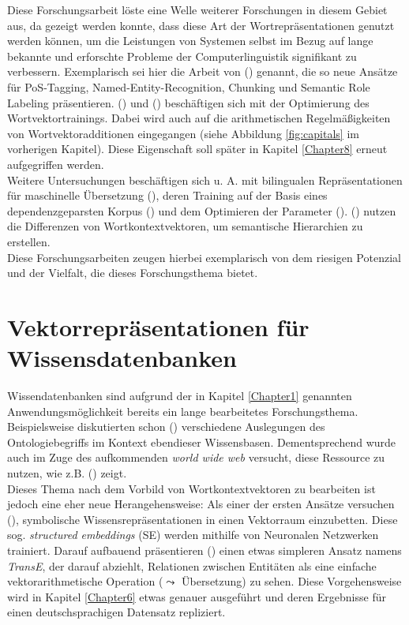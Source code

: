 Diese Forschungsarbeit löste eine Welle weiterer Forschungen in diesem Gebiet aus, da gezeigt werden konnte, dass diese
Art der Wortrepräsentationen genutzt werden können, um die Leistungen von Systemen selbst im Bezug auf lange bekannte und
erforschte Probleme der Computerlinguistik signifikant zu verbessern. Exemplarisch sei hier die Arbeit von
(\cite{collobert2011natural}) genannt, die so neue Ansätze für PoS-Tagging, Named-Entity-Recognition, Chunking und Semantic
Role Labeling präsentieren. (\cite{mikolov2013efficient}) und (\cite{mikolov2013distributed}) beschäftigen sich mit der
Optimierung des Wortvektortrainings. Dabei wird auch auf die arithmetischen Regelmäßigkeiten von Wortvektoradditionen
eingegangen (siehe Abbildung \ref{fig:capitals} im vorherigen Kapitel). Diese Eigenschaft soll später in Kapitel \ref{Chapter8} erneut
aufgegriffen werden.\\

Weitere Untersuchungen beschäftigen sich u. A. mit bilingualen Repräsentationen für maschinelle Übersetzung (\cite{zou2013bilingual}),
deren Training auf der Basis eines dependenzgeparsten Korpus (\cite{levy2014dependency}) und dem Optimieren der Parameter
(\cite{levy2015improving}). (\cite{fu2014learning}) nutzen die Differenzen von Wortkontextvektoren, um semantische
Hierarchien zu erstellen.\\
Diese Forschungsarbeiten zeugen hierbei exemplarisch von dem riesigen Potenzial und der Vielfalt, die dieses
Forschungsthema bietet.

\section{Vektorrepräsentationen für Wissensdatenbanken}

Wissendatenbanken sind aufgrund der in Kapitel \ref{Chapter1} genannten Anwendungsmöglichkeit bereits ein lange bearbeitetes
Forschungsthema. Beispielsweise diskutierten schon (\cite{giaretta1995ontologies}) verschiedene Auslegungen des Ontologiebegriffs
im Kontext ebendieser Wissensbasen. Dementsprechend wurde auch im Zuge des aufkommenden \emph{world wide web} versucht, diese
Ressource zu nutzen, wie z.B. (\cite{craven2000learning}) zeigt.\\
Dieses Thema nach dem Vorbild von Wortkontextvektoren zu bearbeiten ist jedoch eine eher neue Herangehensweise: Als
einer der ersten Ansätze versuchen (\cite{bordes2011learning}), symbolische Wissensrepräsentationen in einen Vektorraum
einzubetten. Diese sog. \emph{structured embeddings} (SE) werden mithilfe von Neuronalen Netzwerken trainiert.
Darauf aufbauend präsentieren (\cite{bordes2013translating}) einen etwas simpleren Ansatz namens \emph{TransE}, der darauf abziehlt, Relationen
zwischen Entitäten als eine einfache vektorarithmetische Operation ($\leadsto$ Übersetzung) zu sehen. Diese Vorgehensweise wird in Kapitel \ref{Chapter6}
etwas genauer ausgeführt und deren Ergebnisse für einen deutschsprachigen Datensatz repliziert.\\

